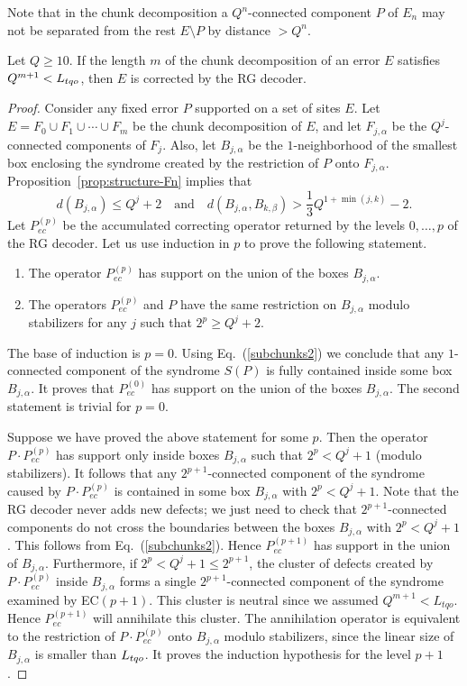 Note that in the chunk decomposition a $Q^n$-connected component $P$ of $E_n$ may not be separated from the rest $E \setminus P$ by distance $> Q^n$.
\begin{lem}
Let $Q \ge 10$. If the length $m$ of the chunk decomposition of an error $E$ satisfies $Q^{m+1} < {L_{tqo}}$, then $E$ is corrected by the RG decoder.
\label{lem:correctability-criterion}
\end{lem}
\begin{proof}
Consider any fixed error $P$ supported on a set of sites $E$.
Let $E=F_0 \cup F_1 \cup \cdots \cup F_m$ be the chunk decomposition of $E$, and
let $F_{j,\alpha}$ be the $Q^j$-connected components of $F_j$.
Also, let $B_{j,\alpha}$ be the $1$-neighborhood of the smallest box enclosing the syndrome
created by the restriction of $P$ onto $F_{j,\alpha}$.
Proposition~\ref{prop:structure-Fn} implies that
\begin{equation}
\label{subchunks2}
d(B_{j,\alpha})\le Q^j+2 \quad \mbox{and} \quad d(B_{j,\alpha}, B_{k,\beta})>\frac13 Q^{1+\min{(j,k)}}-2.
\end{equation}
Let $P_{ec}^{(p)}$ be the accumulated correcting operator returned by the levels $0,\ldots,p$  of the RG decoder.
Let us use induction in $p$ to prove the following statement.
\begin{enumerate}
\item The operator $P_{ec}^{(p)}$ has support on the union of the boxes $B_{j,\alpha}$.
\item  The operators $P_{ec}^{(p)}$ and $P$ have the same restriction on $B_{j,\alpha}$ modulo stabilizers
for any $j$ such that $2^p\ge Q^j+2$.
\end{enumerate}
The base of induction is $p=0$.  Using Eq.~(\ref{subchunks2}) we conclude that any
$1$-connected component of the syndrome $S(P)$ is fully contained
inside some box $B_{j,\alpha}$. It proves that $P_{ec}^{(0)}$ has support on the union of the boxes $B_{j,\alpha}$.
The second statement is trivial for $p=0$.

Suppose we have proved the above statement for some $p$.
Then the operator $P\cdot P_{ec}^{(p)}$ has support only inside
boxes $B_{j,\alpha}$ such that $2^p<Q^j+1$ (modulo stabilizers). It follows that any
$2^{p+1}$-connected component of the syndrome caused by $P\cdot P_{ec}^{(p)}$ is contained in some box
$B_{j,\alpha}$ with $2^p<Q^j+1$. Note that the RG decoder never adds new defects;
we just need to check that $2^{p+1}$-connected components do not cross the boundaries
between the boxes $B_{j,\alpha}$ with $2^p<Q^j+1$. This follows from Eq.~(\ref{subchunks2}).
Hence $P_{ec}^{(p+1)}$
has support in the union of $B_{j,\alpha}$. Furthermore, if
$2^p<Q^j+1\le 2^{p+1}$, the cluster of defects created by $P\cdot P_{ec}^{(p)}$
inside $B_{j,\alpha}$ forms a single  $2^{p+1}$-connected component
of the syndrome examined by  EC$(p+1)$.
This cluster is neutral since we assumed $Q^{m+1}<L_{tqo}$.
Hence $P_{ec}^{(p+1)}$ will annihilate this cluster.
The annihilation operator is equivalent to the restriction of $P\cdot P_{ec}^{(p)}$
onto $B_{j,\alpha}$ modulo stabilizers, since the linear size
of $B_{j,\alpha}$ is smaller than ${L_{tqo}}$. It proves the induction hypothesis
for the level $p+1$. 
\end{proof}
